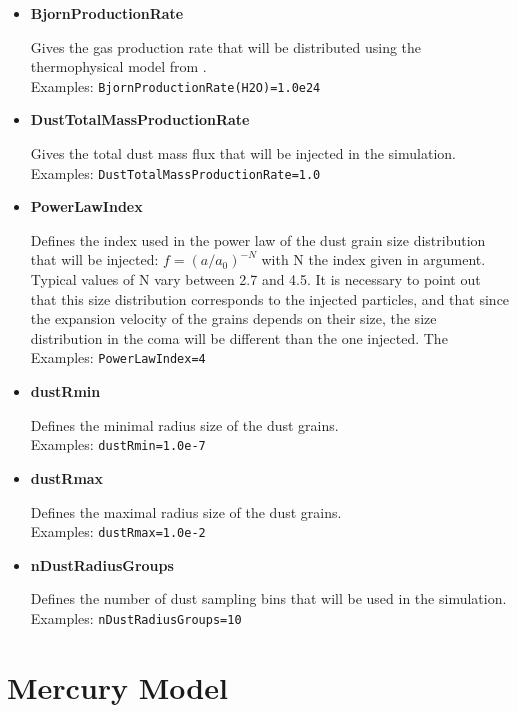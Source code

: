 \begin{itemize}
\item {\bf BjornProductionRate}

Gives the gas production rate that will be distributed using the thermophysical model from \cite{Davidsson-2004-icarus,Davidsson-2005-icarus,Davidsson-2006-icarus}.
\\Examples: {\tt  BjornProductionRate(H2O)=1.0e24}

\item {\bf DustTotalMassProductionRate}

Gives the total dust mass flux that will be injected in the simulation.
\\Examples: {\tt DustTotalMassProductionRate=1.0}

\item {\bf PowerLawIndex}

Defines the index used in the power law of the dust grain size distribution that will be injected: $f=\left(a/a_{0}\right)^{-N}$ with N the index given in argument. Typical values of N vary between 2.7 and 4.5. It is necessary to point out that this size distribution corresponds to the injected particles, and that since the expansion velocity of the grains depends on their size, the size distribution in the coma will be different than the one injected. The 
\\Examples: {\tt PowerLawIndex=4}

\item {\bf dustRmin}

Defines the minimal radius size of the dust grains.
\\Examples: {\tt dustRmin=1.0e-7}

\item {\bf dustRmax}

Defines the maximal radius size of the dust grains.
\\Examples: {\tt dustRmax=1.0e-2}

\item {\bf nDustRadiusGroups}

Defines the number of dust sampling bins that will be used in the simulation.
\\Examples: {\tt nDustRadiusGroups=10}

\end{itemize}


\section{Mercury Model}



